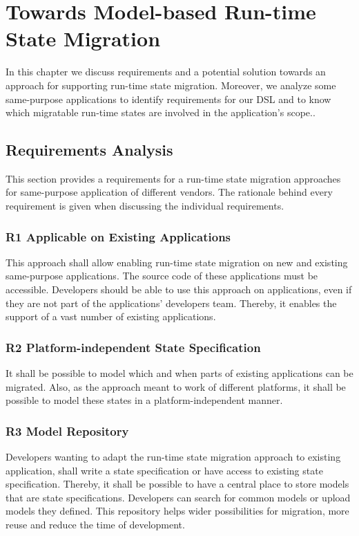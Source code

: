 \chapter{Towards Model-based Run-time State Migration}
In this chapter we discuss requirements and a potential solution towards an approach for supporting run-time state migration. Moreover, we analyze some same-purpose applications to identify requirements for our DSL and to know which migratable run-time states are involved in the application's scope..

\label{ch:requirements}

\section{Requirements Analysis}
This section provides a requirements for a run-time state migration approaches for same-purpose application of different vendors. The rationale behind every requirement is given when discussing the individual requirements. 

\subsection{R1 Applicable on Existing Applications}
This approach shall allow enabling run-time state migration on new and existing same-purpose applications. The source code of these applications must be accessible. Developers should be able to use this approach on applications, even if they are not part of the applications' developers team. Thereby, it enables the support of a vast number of existing applications.


\subsection{R2 Platform-independent State Specification}
It shall be possible to model which and when parts of existing applications can be migrated. Also, as the approach meant to work of different platforms, it shall be possible to model these states in a platform-independent manner.

\subsection{R3 Model Repository}
Developers wanting to adapt the run-time state migration approach to existing application, shall write a state specification or have access to existing state specification. Thereby, it shall be possible to have a central place to store models that are state specifications. Developers can search for common models or upload models they defined. This repository helps wider possibilities for migration, more reuse and reduce the time of development. 

